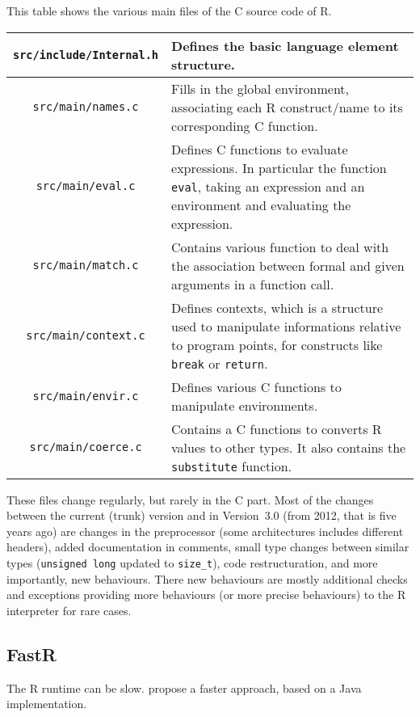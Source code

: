 \documentclass{article}
\newcommand\R{R}
\newcommand\Cn{C}
\begin{document}
This table shows the various main files of the \Cn{} source code of \R{}.

\begin{tabular}{|c|p{7cm}|}
    \hline
    \texttt{src/include/Internal.h} & Defines the basic language element structure. \\
    \hline
    \texttt{src/main/names.c} & Fills in the global environment, associating each \R{} construct/name to its corresponding \Cn{} function. \\
    \hline
    \texttt{src/main/eval.c} & Defines \Cn{} functions to evaluate expressions. In particular the function \texttt{eval}, taking an expression and an environment and evaluating the expression. \\
    \hline
    \texttt{src/main/match.c} & Contains various function to deal with the association between formal and given arguments in a function call. \\
    \hline
    \texttt{src/main/context.c} & Defines contexts, which is a structure used to manipulate informations relative to program points, for constructs like \texttt{break} or \texttt{return}. \\
    \hline
    \texttt{src/main/envir.c} & Defines various \Cn{} functions to manipulate environments. \\
    \hline
    \texttt{src/main/coerce.c} & Contains a \Cn{} functions to converts \R{} values to other types. It also contains the \texttt{substitute} function. \\
    \hline
\end{tabular}

These files change regularly,
but rarely in the \Cn{} part.
Most of the changes between the current (trunk) version
and in Version~\(3.0\) (from 2012, that is five years ago)
are changes in the preprocessor
(some architectures includes different headers),
added documentation in comments,
small type changes between similar types
(\texttt{unsigned long} updated to \texttt{size_t}),
code restructuration,
and more importantly,
new behaviours.
There new behaviours are mostly additional checks
and exceptions providing more behaviours
(or more precise behaviours) to the \R{} interpreter
for rare cases.

\subsection{FastR}

The \R{} runtime can be slow.
\cite{kalibera2014fast} propose a faster approach,
based on a Java implementation.
\end{document}
